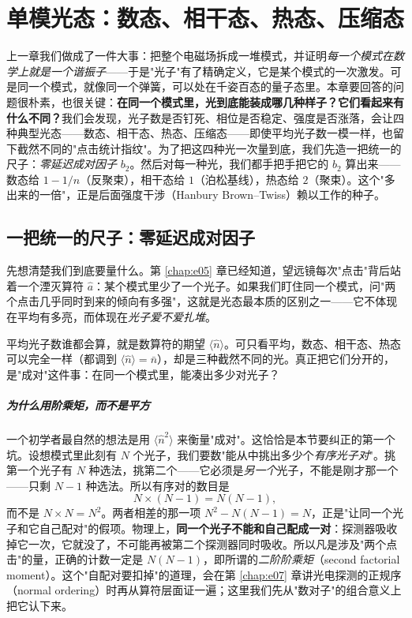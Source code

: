 \chapter{单模光态：数态、相干态、热态、压缩态}
\label{chap:e06}

\begin{chapteropening}
上一章我们做成了一件大事：把整个电磁场拆成一堆模式，并证明\emph{每一个模式在数学上就是一个谐振子}——于是"光子"有了精确定义，它是某个模式的一次激发。可是同一个模式，就像同一个弹簧，可以处在千姿百态的量子态里。本章要回答的问题很朴素，也很关键：\textbf{在同一个模式里，光到底能装成哪几种样子？它们看起来有什么不同？}我们会发现，光子数是否钉死、相位是否稳定、强度是否涨落，会让四种典型光态——数态、相干态、热态、压缩态——即使平均光子数一模一样，也留下截然不同的"点击统计指纹"。为了把这四种光一次量到底，我们先造一把统一的尺子：\emph{零延迟成对因子} \(b_2\)。然后对每一种光，我们都手把手把它的 \(b_2\) 算出来——数态给 \(1-1/n\)（反聚束），相干态给 \(1\)（泊松基线），热态给 \(2\)（聚束）。这个"多出来的一倍"，正是后面强度干涉（Hanbury Brown--Twiss）赖以工作的种子。
\end{chapteropening}

\section{一把统一的尺子：零延迟成对因子}
\label{sec:e06-b2}

先想清楚我们到底要量什么。第 \ref{chap:e05} 章已经知道，望远镜每次"点击"背后站着一个湮灭算符 \(\hat a\)：某个模式里少了一个光子。如果我们盯住同一个模式，问"两个点击几乎同时到来的倾向有多强"，这就是光态最本质的区别之一——它不体现在平均有多亮，而体现在\emph{光子爱不爱扎堆}。

平均光子数谁都会算，就是数算符的期望 \(\langle\hat n\rangle\)。可只看平均，数态、相干态、热态可以完全一样（都调到 \(\langle\hat n\rangle=\bar n\)），却是三种截然不同的光。真正把它们分开的，是"成对"这件事：在同一个模式里，能凑出多少对光子？

\paragraph{为什么用阶乘矩，而不是平方}
\label{sec:e06-why-factorial}

一个初学者最自然的想法是用 \(\langle\hat n^2\rangle\) 来衡量"成对"。这恰恰是本节要纠正的第一个坑。设想模式里此刻有 \(N\) 个光子，我们要数"能从中挑出多少个\emph{有序光子对}"。挑第一个光子有 \(N\) 种选法，挑第二个——它必须是\emph{另一个}光子，不能是刚才那一个——只剩 \(N-1\) 种选法。所以有序对的数目是
\[
  N\times(N-1)=N(N-1),
\]
而不是 \(N\times N=N^2\)。两者相差的那一项 \(N^2-N(N-1)=N\)，正是"让同一个光子和它自己配对"的假项。物理上，\textbf{同一个光子不能和自己配成一对}：探测器吸收掉它一次，它就没了，不可能再被第二个探测器同时吸收。所以凡是涉及"两个点击"的量，正确的计数一定是 \(N(N-1)\)，即所谓的\emph{二阶阶乘矩}（second factorial moment）。这个"自配对要扣掉"的道理，会在第 \ref{chap:e07} 章讲光电探测的正规序（normal ordering）时再从算符层面证一遍；这里我们先从"数对子"的组合意义上把它认下来。

